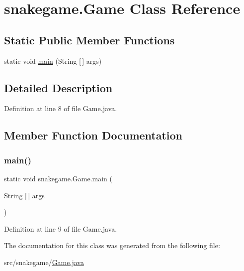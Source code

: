 \hypertarget{classsnakegame_1_1_game}{}\section{snakegame.\+Game Class Reference}
\label{classsnakegame_1_1_game}
\subsection*{Static Public Member Functions}
\begin{DoxyCompactItemize}
\item 
static void \mbox{\hyperlink{classsnakegame_1_1_game_a5da8884fe16160449cf02f7c594b2f79}{main}} (String \mbox{[}$\,$\mbox{]} args)
\end{DoxyCompactItemize}


\subsection{Detailed Description}


Definition at line 8 of file Game.\+java.



\subsection{Member Function Documentation}
\mbox{\label{classsnakegame_1_1_game_a5da8884fe16160449cf02f7c594b2f79}} 
\subsubsection{\texorpdfstring{main()}{main()}}
{\footnotesize\ttfamily static void snakegame.\+Game.\+main (\begin{DoxyParamCaption}\item[{String \mbox{[}$\,$\mbox{]}}]{args }\end{DoxyParamCaption})\hspace{0.3cm}{\ttfamily [static]}}



Definition at line 9 of file Game.\+java.



The documentation for this class was generated from the following file\+:\begin{DoxyCompactItemize}
\item 
src/snakegame/\mbox{\hyperlink{_game_8java}{Game.\+java}}\end{DoxyCompactItemize}
